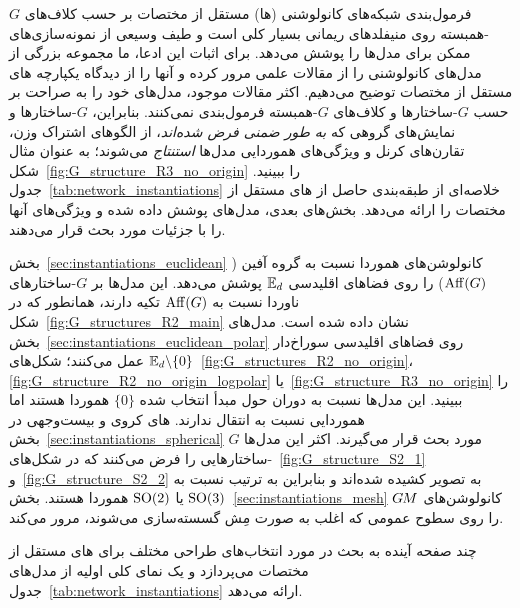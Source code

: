 
\label{part:literature_review}

فرمول‌بندی شبکه‌های کانولوشنی (\CNN ها) مستقل از مختصات بر حسب کلاف‌های $G$-همبسته روی منیفلدهای ریمانی بسیار کلی است و طیف وسیعی از نمونه‌سازی‌های ممکن برای مدل‌ها را پوشش می‌دهد.
برای اثبات این ادعا، ما مجموعه بزرگی از مدل‌های کانولوشنی را از مقالات علمی مرور کرده و آنها را از دیدگاه یکپارچه \CNN های مستقل از مختصات توضیح می‌دهیم.
اکثر مقالات موجود، مدل‌های خود را به صراحت بر حسب $G$-ساختارها و کلاف‌های $G$-همبسته فرمول‌بندی نمی‌کنند.
بنابراین، $G$-ساختارها و نمایش‌های گروهی که \emph{به طور ضمنی فرض شده‌اند}، از الگوهای اشتراک وزن، تقارن‌های کرنل و ویژگی‌های هموردایی مدل‌ها \emph{استنتاج} می‌شوند؛ به عنوان مثال شکل~\ref{fig:G_structure_R3_no_origin} را ببینید.
جدول~\ref{tab:network_instantiations} خلاصه‌ای از طبقه‌بندی حاصل از \CNN های مستقل از مختصات را ارائه می‌دهد.
بخش‌های بعدی، مدل‌های پوشش داده شده و ویژگی‌های آنها را با جزئیات مورد بحث قرار می‌دهند.

\etocsettocstyle{}{} %
\localtableofcontents

بخش~\ref{sec:instantiations_euclidean} کانولوشن‌های هموردا نسبت به گروه آفين ($\operatorname{Aff}(G)$) را روی فضاهای اقلیدسی $\mathbb{E}_d$ پوشش می‌دهد.
این مدل‌ها بر $G$-ساختارهای ناوردا نسبت به $\operatorname{Aff}(G)$ تکیه دارند، همانطور که در شکل~\ref{fig:G_structures_R2_main} نشان داده شده است.
مدل‌های بخش~\ref{sec:instantiations_euclidean_polar} روی فضاهای اقلیدسی سوراخ‌دار $\mathbb{E}_d\backslash\{0\}$ عمل می‌کنند؛ شکل‌های~\ref{fig:G_structures_R2_no_origin}، \ref{fig:G_structure_R2_no_origin_logpolar} یا~\ref{fig:G_structure_R3_no_origin} را ببینید.
این مدل‌ها نسبت به دوران حول مبدأ انتخاب شده $\{0\}$ هموردا هستند اما هموردایی نسبت به انتقال ندارند.
\CNN های کروی و بیست‌وجهی در بخش~\ref{sec:instantiations_spherical} مورد بحث قرار می‌گیرند.
اکثر این مدل‌ها $G$-ساختارهایی را فرض می‌کنند که در شکل‌های~\ref{fig:G_structure_S2_1} و~\ref{fig:G_structure_S2_2} به تصویر کشیده شده‌اند و بنابراین به ترتیب نسبت به $\operatorname{SO}(3)$ یا $\operatorname{SO}(2)$ هموردا هستند.
بخش~\ref{sec:instantiations_mesh} کانولوشن‌های $G\mkern-1.4muM$ را روی سطوح عمومی که اغلب به صورت مِش گسسته‌سازی می‌شوند، مرور می‌کند.

چند صفحه آینده به بحث در مورد انتخاب‌های طراحی مختلف برای \CNN های مستقل از مختصات می‌پردازد و یک نمای کلی اولیه از مدل‌های جدول~\ref{tab:network_instantiations} ارائه می‌دهد.

